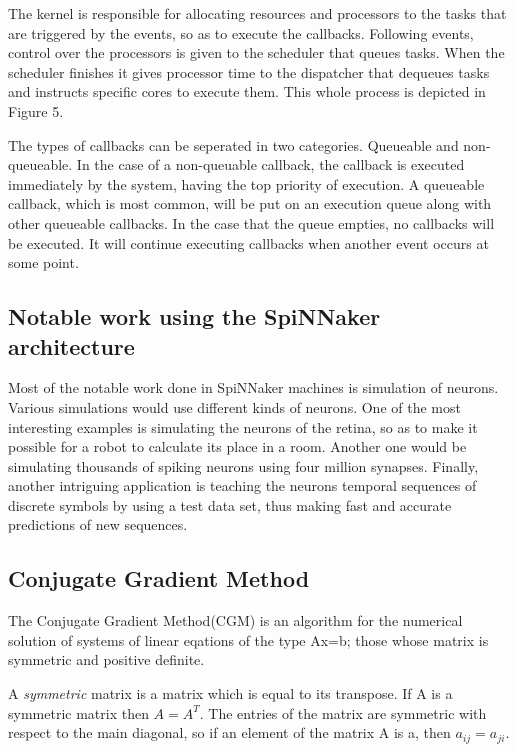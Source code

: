 \documentclass[12pt,a4paper]{article}
\begin{document}
The kernel is responsible for allocating resources and processors to the tasks that are triggered by the events, so as to execute the callbacks. Following events, control over the processors is given to the scheduler that queues tasks. When the scheduler finishes it gives processor time to the dispatcher that dequeues tasks and instructs specific cores to execute them. This whole process is depicted in Figure 5.

The types of callbacks can be seperated in two categories. Queueable and non-queueable. In the case of a non-queuable callback, the callback is executed immediately by the system, having the top priority of execution. A queueable callback, which is most common, will be put on an execution queue along with other queueable callbacks. In the case that the queue empties, no callbacks will be executed. It will continue executing callbacks when another event occurs at some point\cite{sharp2011event}\cite{rast2012managing}. 
	
\subsection{Notable work using the SpiNNaker architecture}
Most of the notable work done in SpiNNaker machines is simulation of neurons. Various simulations would use different kinds of neurons\cite{rast2012event}\cite{rast2011event}\cite{davies2011maintaining}\cite{jin2010algorithm}. One of the most interesting examples is simulating the neurons of the retina, so as to make it possible for a robot to calculate its place in a room\cite{davies2010interfacing}. Another one would be simulating thousands of spiking neurons using four million synapses\cite{sharp2012power}. Finally, another intriguing application is teaching the neurons temporal sequences  of discrete symbols by using a test data set, thus making fast and accurate predictions of new sequences\cite{bose2005spiking}.

\subsection{Conjugate Gradient Method}
The Conjugate Gradient Method(CGM) is an algorithm for the numerical solution of systems of linear eqations of the type Ax=b; those whose matrix is symmetric and positive definite. 

A \emph{symmetric} matrix is a matrix which is equal to its transpose. If A is a symmetric matrix then $A=A^T$. The entries of the matrix are symmetric with respect to the main diagonal, so if an element of the matrix A is a, then $a_{ij}=a_{ji}$. 
\end{document}
